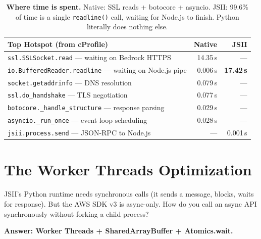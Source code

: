 \documentclass[11pt]{article}
\begin{document}
\begin{table}[H]
\centering
\renewcommand{\arraystretch}{1.25}
\small
{}
\begin{tabularx}{\textwidth}{@{}X r r@{}}
\toprule
\textbf{Top Hotspot (from cProfile)} & \textbf{Native} & \textbf{JSII} \\
\midrule
\texttt{ssl.SSLSocket.read} — waiting on Bedrock HTTPS & 14.35\,s & — \\
\texttt{io.BufferedReader.readline} — waiting on Node.js pipe & 0.006\,s & \textbf{17.42\,s} \\
\texttt{socket.getaddrinfo} — DNS resolution & 0.079\,s & — \\
\texttt{ssl.do\_handshake} — TLS negotiation & 0.077\,s & — \\
\texttt{botocore.\_handle\_structure} — response parsing & 0.029\,s & — \\
\texttt{asyncio.\_run\_once} — event loop scheduling & 0.028\,s & — \\
\texttt{jsii.process.send} — JSON-RPC to Node.js & — & 0.001\,s \\
\bottomrule
\end{tabularx}
\caption{\textbf{Where time is spent.} Native: SSL reads + botocore + asyncio. JSII: 99.6\% of time is a single \texttt{readline()} call, waiting for Node.js to finish. Python literally does nothing else.}
\label{tab:hotspots}
\end{table}

\section{The Worker Threads Optimization}

JSII's Python runtime needs synchronous calls (it sends a message, blocks, waits for response). But the AWS SDK v3 is async-only. How do you call an async API synchronously without forking a child process?

\textbf{Answer: Worker Threads + SharedArrayBuffer + Atomics.wait.}
\end{document}
